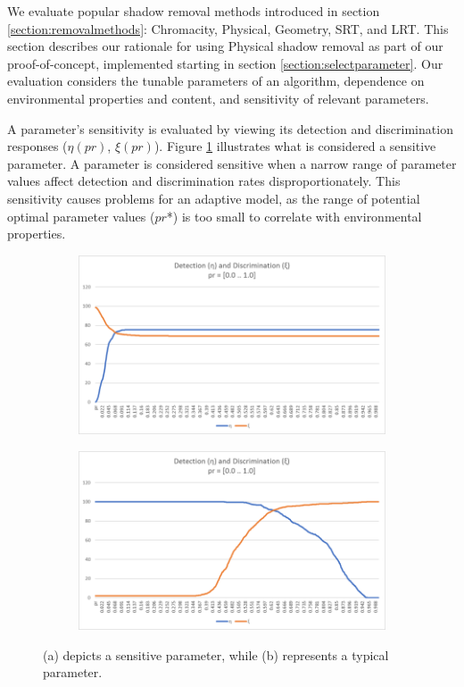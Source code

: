 We evaluate popular shadow removal methods introduced in section \ref{section:removalmethods}: Chromacity, Physical, Geometry, SRT, and LRT. This section describes our rationale for using Physical shadow removal as part of our proof-of-concept, implemented starting in section \ref{section:selectparameter}. Our evaluation considers the tunable parameters of an algorithm, dependence on environmental properties and content, and sensitivity of relevant parameters.

A parameter's sensitivity is evaluated by viewing its detection and discrimination responses ($\eta(pr)$, $\xi(pr)$). Figure \ref{fig:paramsensitivity} illustrates what is considered a sensitive parameter. A parameter is considered sensitive when a narrow range of parameter values affect detection and discrimination rates disproportionately. This sensitivity causes problems for an adaptive model, as the range of potential optimal parameter values ($pr$*) is too small to correlate with environmental properties. 

\begin{figure}
\centering
\begin{subfigure}{.49\linewidth}
  \includegraphics[width=1\linewidth]{figures/sensitive_param.jpg}
  \caption{}
\end{subfigure}
\hfill
\begin{subfigure}{.49\linewidth}
  \includegraphics[width=1\linewidth]{figures/campus_dd.jpg}
  \caption{}
\end{subfigure}

\caption{(a) depicts a sensitive parameter, while (b) represents a typical parameter.}
\label{fig:paramsensitivity}
\end{figure}


